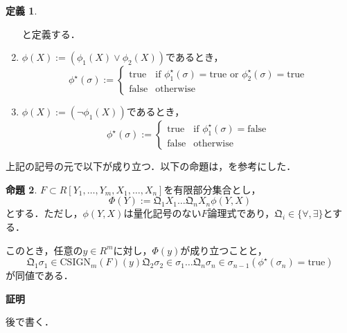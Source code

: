 \documentclass[uplatex, dvipdfmx]{jsarticle}
\makeatletter
\numberwithin{equation}{section}
\renewenvironment{proof}[1][\proofname]{\par
  \pushQED{\qed}%
  \normalfont \topsep6\p@\@plus6\p@\relax
  \trivlist
  \item\relax
  {\bfseries
  #1\@addpunct{.}}\hspace\labelsep\ignorespaces
}{
  \popQED\endtrivlist\@endpefalse
}
\newcommand{\Qua}{\mathfrak{Q}}
\newcommand{\CSIGN}{\mathrm{CSIGN}}
\newcommand{\true}{\text{true}}
\newcommand{\false}{\text{false}}
\theoremstyle{definition}
\newtheorem{definition}{定義}[section]
\newtheorem{proposition}[definition]{命題}
\renewcommand{\proofname}{\textbf{証明}}
\makeatother
\begin{document}
\begin{definition}
\begin{enumerate}
\begin{equation}
          \end{equation}
          と定義する．
          \item $\phi(X):=(\phi_1(X) \lor \phi_2(X))$であるとき，
          \begin{equation}
               \phi^\star(\sigma):= \begin{cases}
                    \true  & \text{if $\phi_1^\star(\sigma)=\true$ or $\phi_2^\star(\sigma)=\true$}\\
                    \false & \text{otherwise}
               \end{cases}
          \end{equation}
          \item $\phi(X):=(\lnot \phi_1(X))$であるとき，
          \begin{equation}
               \phi^\star(\sigma):= \begin{cases}
                    \true  & \text{if $\phi_1^\star(\sigma)=\false$}\\
                    \false & \text{otherwise}
               \end{cases}
          \end{equation}
     \end{enumerate}
\end{definition}

上記の記号の元で以下が成り立つ．以下の命題は，\cite[Proposition 11.14.]{MR2248869}を参考にした．
\begin{proposition}
     $F \subset R[Y_1, \dots, Y_m, X_1, \dots, X_n]$を有限部分集合とし，
     \begin{equation}
          \Phi(Y):= \Qua_1 X_1 \dots \Qua_n X_n \phi(Y,X)
     \end{equation}
     とする．ただし，$\phi(Y,X)$は量化記号のない$F$論理式であり，$\Qua_i \in \{\forall, \exists\}$とする．

     このとき，任意の$y \in R^m$に対し，$\Phi(y)$が成り立つことと，
     \begin{equation}
          \Qua_1 \sigma_1 \in \CSIGN_m(F)(y) \Qua_2 \sigma_2 \in \sigma_1 \dots \Qua_n \sigma_n \in \sigma_{n-1} (\phi^\star(\sigma_n) = \true)
     \end{equation}
     が同値である．
\end{proposition}

\begin{proof}
     後で書く．
\end{proof}
\end{document}
